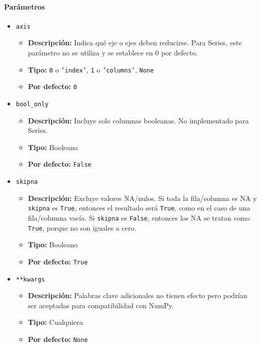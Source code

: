         \paragraph{\textbf{Parámetros}}
        \begin{itemize}
            \item \texttt{axis}
                \begin{itemize}
                    \item \textbf{Descripción:} Indica qué eje o ejes deben reducirse. Para Series, este parámetro no se utiliza y se establece en 0 por defecto.
                    \item \textbf{Tipo:} \texttt{0} o \texttt{'index'}, \texttt{1} o \texttt{'columns'}, \texttt{None}
                    \item \textbf{Por defecto:} \texttt{0}
                \end{itemize}
            \item \texttt{bool\_only}
                \begin{itemize}
                    \item \textbf{Descripción:} Incluye solo columnas booleanas. No implementado para Series.
                    \item \textbf{Tipo:} Booleano
                    \item \textbf{Por defecto:} \texttt{False}
                \end{itemize}
            \item \texttt{skipna}
                \begin{itemize}
                    \item \textbf{Descripción:} Excluye valores NA/nulos. Si toda la fila/columna es NA y \texttt{skipna} es \texttt{True}, entonces el resultado será \texttt{True}, como en el caso de una fila/columna vacía. Si \texttt{skipna} es \texttt{False}, entonces los NA se tratan como \texttt{True}, porque no son iguales a cero.
                    \item \textbf{Tipo:} Booleano
                    \item \textbf{Por defecto:} \texttt{True}
                \end{itemize}
            \item \texttt{**kwargs}
                \begin{itemize}
                    \item \textbf{Descripción:} Palabras clave adicionales no tienen efecto pero podrían ser aceptadas para compatibilidad con NumPy.
                    \item \textbf{Tipo:} Cualquiera
                    \item \textbf{Por defecto:} \texttt{None}
                \end{itemize}
        \end{itemize}

